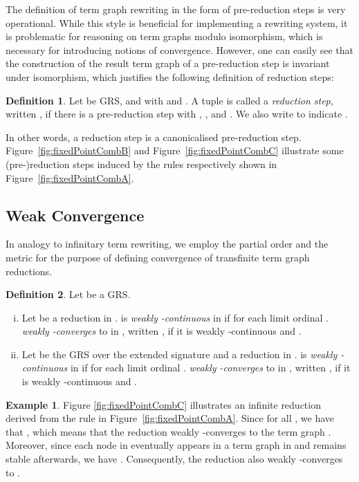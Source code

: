 \documentclass[copyright,creativecommons,UKenglish,final]{eptcs}
\theoremstyle{definition}
\newtheorem{definition}{Definition}[section]
\newtheorem{example}{Example}[section]
\theoremstyle{plain}
\begin{document}
The definition of term graph rewriting in the form of pre-reduction
steps is very operational. While this style is beneficial for
implementing a rewriting system, it is problematic for reasoning on
term graphs modulo isomorphism, which is necessary for introducing
notions of convergence. However, one can easily see that the
construction of the result term graph of a pre-reduction step is
invariant under isomorphism, which justifies the following definition
of reduction steps:
\begin{definition}Let  be GRS,  and  with  and . A tuple  is called a \emph{reduction step}, written , if there is a pre-reduction step  with , , and . We also write  to
  indicate .
\end{definition}
In other words, a reduction step is a canonicalised pre-reduction
step. Figure~\ref{fig:fixedPointCombB} and
Figure~\ref{fig:fixedPointCombC} illustrate some (pre-)reduction steps
induced by the rules  respectively  shown in
Figure~\ref{fig:fixedPointCombA}.




\subsection{Weak Convergence}
\label{sec:weak-convergence}

In analogy to infinitary term rewriting, we employ the partial order
 and the metric  for the purpose of defining
convergence of transfinite term graph reductions.
\begin{definition}Let  be a GRS.
  \begin{enumerate}[(i)]
  \item Let  be
    a reduction in .  is \emph{weakly -continuous} in
     if  for
    each limit ordinal .  \emph{weakly
      -converges} to  in , written
    , if it is weakly -continuous
    and .
  \item Let  be the GRS  over the
    extended signature  and  a reduction in .  is
    \emph{weakly -continuous} in  if
     for each limit ordinal
    .  \emph{weakly -converges} to
     in , written , if it is weakly -continuous and
    .
  \end{enumerate}
\end{definition}

\begin{example}
  \label{ex:fixedPointCombWeak}
  Figure \ref{fig:fixedPointCombC} illustrates an infinite reduction
  derived from the rule  in Figure~\ref{fig:fixedPointCombA}.
  Since  for all
  , we have that ,
  which means that the reduction weakly -converges to the term
  graph . Moreover, since each node in  eventually
  appears in a term graph in  and remains stable
  afterwards, we have . Consequently, the reduction also weakly -converges
  to .
\end{example}
\end{document}
